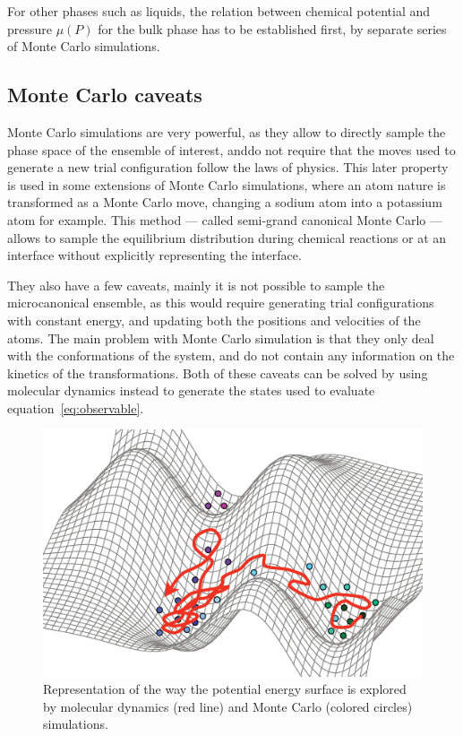 \documentclass[thesis]{subfiles}
\begin{document}
For other phases such as liquids, the relation between chemical potential and
pressure $\mu(P)$ for the bulk phase has to be established first, by separate
series of Monte Carlo simulations.

\subsection{Monte Carlo caveats}

Monte Carlo simulations are very powerful, as they allow to directly sample the
phase space of the ensemble of interest, anddo not require that the moves used
to generate a new trial configuration follow the laws of physics. This later
property is used in some extensions of Monte Carlo simulations, where an atom
nature is transformed as a Monte Carlo move, changing a sodium atom into a
potassium atom for example. This method --- called semi-grand canonical Monte
Carlo\cite{Kofke1988} --- allows to sample the equilibrium distribution during
chemical reactions or at an interface without explicitly representing the
interface.

They also have a few caveats, mainly it is not possible to sample the
microcanonical  ensemble, as this would require generating trial configurations
with constant energy, and updating both the positions and velocities of the
atoms. The main problem with Monte Carlo simulation is that they only deal with
the conformations of the system, and do not contain any information on the
kinetics of the transformations. Both of these caveats can be solved by using
molecular dynamics instead to generate the states used to evaluate
equation~\eqref{eq:observable}.

\begin{figure}[b]
    \centering
    \includegraphics[width=\textwidth]{figures/images/mc-vs-md}
    \caption{Representation of the way the potential energy surface is explored
    by molecular dynamics (red line) and Monte Carlo (colored circles)
    simulations.}
    \label{fig:mc-vs-md}
\end{figure}
\end{document}
